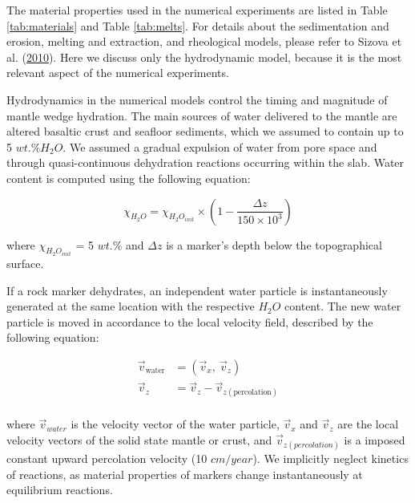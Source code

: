 The material properties used in the numerical experiments are listed in Table \ref{tab:materials} and Table \ref{tab:melts}. For details about the sedimentation and erosion, melting and extraction, and rheological models, please refer to Sizova et al. (\protect\hyperlink{ref-sizova2010}{2010}). Here we discuss only the hydrodynamic model, because it is the most relevant aspect of the numerical experiments.

Hydrodynamics in the numerical models control the timing and magnitude of mantle wedge hydration. The main sources of water delivered to the mantle are altered basaltic crust and seafloor sediments, which we assumed to contain up to 5 \(wt.\% H_{2}O\). We assumed a gradual expulsion of water from pore space and through quasi-continuous dehydration reactions occurring within the slab. Water content is computed using the following equation:

\begin{equation}
  \chi_{H_{2}O} = \chi_{H_{2}O_{init}}\times\left(1-\frac{\Delta z}{150\times 10^{3}}\right)
\end{equation}

where \(\chi_{H_{2}O_{init}}\) = 5 \(wt.\%\) and \(\Delta z\) is a marker's depth below the topographical surface.

If a rock marker dehydrates, an independent water particle is instantaneously generated at the same location with the respective \(H_{2}O\) content. The new water particle is moved in accordance to the local velocity field, described by the following equation:

\begin{equation}
  \begin{aligned}
    \vec{v}_{\text{water}} & = (\vec{v}_x,\ \vec{v}_z) \\
    \vec{v}_z & = \vec{v}_z - \vec{v}_{z(\text{percolation})} \\
  \end{aligned}
\end{equation}

where \(\vec{v}_{water}\) is the velocity vector of the water particle, \(\vec{v}_{x}\) and \(\vec{v}_{z}\) are the local velocity vectors of the solid state mantle or crust, and \(\vec{v}_{z(percolation)}\) is a imposed constant upward percolation velocity (10 \(cm/year\)). We implicitly neglect kinetics of reactions, as material properties of markers change instantaneously at equilibrium reactions.

